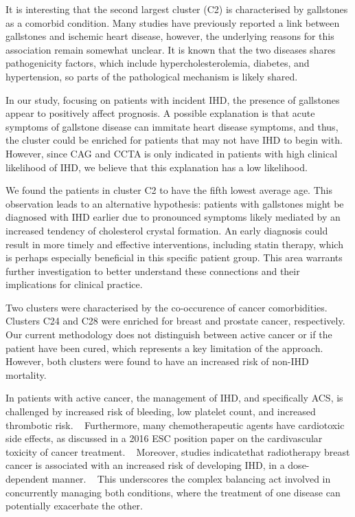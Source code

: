 It is interesting that the second largest cluster (C2)
is characterised by gallstones as a comorbid condition.
Many studies have previously reported a link between
gallstones and ischemic heart disease,
\autocite{zhengGallstones2016}
\autocite{upalaGallstone2017}
\autocite{wirthPresence2015}
however, the underlying reasons for this association remain
somewhat unclear.
It is known that the two diseases shares pathogenicity factors,
which include hypercholesterolemia, diabetes, and hypertension,
so parts of the pathological mechanism is likely shared.
\autocite{zhengGallstones2016}

In our study, focusing on patients with incident \ac{IHD},
the presence of gallstones appear to positively affect prognosis.
A possible explanation is that acute symptoms of gallstone disease
can immitate heart disease symptoms, and thus, the cluster could be 
enriched for patients that may not have \ac{IHD} to begin with.
However, since \ac{CAG} and \ac{CCTA} is only indicated 
in patients with high clinical likelihood of \ac{IHD}, 
we believe that this explanation has a low likelihood.  

We found the patients in cluster C2 to have the fifth lowest average age.
This observation leads to an alternative hypothesis: patients with gallstones 
might be diagnosed with \ac{IHD} earlier due to pronounced symptoms 
likely mediated by an increased tendency of cholesterol crystal formation.
An early diagnosis could result in more timely and effective interventions,
including statin therapy, which is perhaps especially beneficial 
in this specific patient group.
This area warrants further investigation to better understand these connections
and their implications for clinical practice.

Two clusters were characterised by the co-occurence of cancer comorbidities.
Clusters C24 and C28 were enriched for breast and prostate cancer, 
respectively.
Our current methodology does not distinguish between active cancer
or if the patient have been cured, which represents a key limitation
of the approach.
However, both clusters were found to have an increased risk of 
non-\ac{IHD} mortality.

In patients with active cancer,
the management of \ac{IHD}, and specifically \ac{ACS}, 
is challenged by increased risk of bleeding,
low platelet count, and increased thrombotic risk.
~\autocite{byrne20232023}
Furthermore, 
many chemotherapeutic agents have cardiotoxic side effects,
as discussed in a 2016 \ac{ESC} position paper on the 
cardivascular toxicity of cancer treatment.
~\autocite{zamorano20162016}
Moreover,
studies indicatethat radiotherapy breast cancer
is associated with an increased risk of developing \ac{IHD}, 
in a dose-dependent manner.
~\autocite{darbyRisk2013}
This underscores the complex balancing act involved in concurrently managing
both conditions, where the treatment of one disease can potentially exacerbate
the other.

